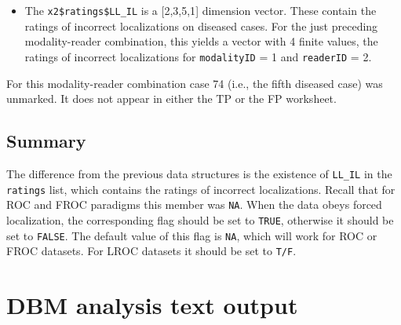 \documentclass[
]{book}
\newenvironment{Shaded}{\begin{snugshade}}{\end{snugshade}}
\newcommand{\CommentTok}[1]{\textcolor[rgb]{0.56,0.35,0.01}{\textit{#1}}}
\newcommand{\DecValTok}[1]{\textcolor[rgb]{0.00,0.00,0.81}{#1}}
\newcommand{\NormalTok}[1]{#1}
\newcommand{\SpecialCharTok}[1]{\textcolor[rgb]{0.00,0.00,0.00}{#1}}
\providecommand{\tightlist}{%
  \setlength{\itemsep}{0pt}\setlength{\parskip}{0pt}}
\begin{document}
\begin{Shaded}
\end{Shaded}

\begin{itemize}
\tightlist
\item
  The \texttt{x2\$ratings\$LL\_IL} is a {[}2,3,5,1{]} dimension vector. These contain the ratings of incorrect localizations on diseased cases. For the just preceding modality-reader combination, this yields a vector with 4 finite values, the ratings of incorrect localizations for \texttt{modalityID} = 1 and \texttt{readerID} = 2.
\end{itemize}

\begin{Shaded}
\end{Shaded}

For this modality-reader combination case 74 (i.e., the fifth diseased case) was unmarked. It does not appear in either the TP or the FP worksheet.

\hypertarget{quick-start-lroc-data-summary}{%
\section{Summary}\label{quick-start-lroc-data-summary}}

The difference from the previous data structures is the existence of \texttt{LL\_IL} in the \texttt{ratings} list, which contains the ratings of incorrect localizations. Recall that for ROC and FROC paradigms this member was \texttt{NA}. When the data obeys forced localization, the corresponding flag should be set to \texttt{TRUE}, otherwise it should be set to \texttt{FALSE}. The default value of this flag is \texttt{NA}, which will work for ROC or FROC datasets. For LROC datasets it should be set to \texttt{T/F}.

\hypertarget{quick-start-dbm-text}{%
\chapter{DBM analysis text output}\label{quick-start-dbm-text}}
\end{document}
